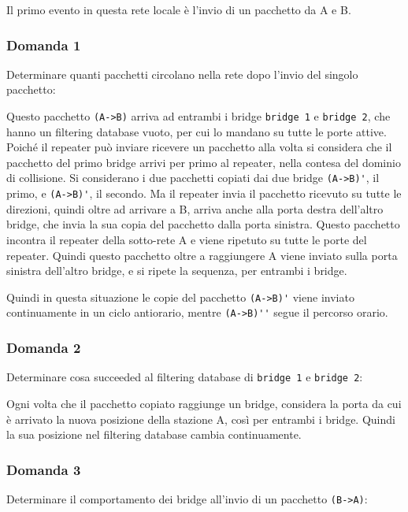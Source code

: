 \documentclass{article}
\numberwithin{equation}{subsection}
\begin{document}
Il primo evento in questa rete locale è l'invio di un pacchetto da A e B. 

\subsubsection*{Domanda 1}

Determinare quanti pacchetti circolano nella rete dopo l'invio del singolo pacchetto:

Questo pacchetto \verb|(A->B)| arriva ad entrambi i bridge \verb|bridge 1| e \verb|bridge 2|, che hanno un filtering database vuoto, per cui lo mandano su tutte le 
porte attive. Poiché il repeater può inviare ricevere un pacchetto alla volta si considera che il pacchetto del primo bridge arrivi per primo al repeater, nella 
contesa del dominio di collisione. Si considerano i due pacchetti copiati dai due bridge \verb|(A->B)'|, il primo, e \verb|(A->B)'|, il secondo. 
Ma il repeater invia il pacchetto ricevuto su tutte le direzioni, quindi oltre ad arrivare a B, arriva anche alla porta destra dell'altro bridge, che invia la sua copia 
del pacchetto dalla porta sinistra. Questo pacchetto incontra il repeater della sotto-rete A e viene ripetuto su tutte le porte del repeater. Quindi questo pacchetto 
oltre a raggiungere A viene inviato sulla porta sinistra dell'altro bridge, e si ripete la sequenza, per entrambi i bridge. 

Quindi in questa situazione le copie del pacchetto \verb|(A->B)'| viene inviato continuamente in un ciclo antiorario, mentre \verb|(A->B)''| segue il percorso 
orario. 

\subsubsection*{Domanda 2}

Determinare cosa succeeded al filtering database di \verb|bridge 1| e \verb|bridge 2|:

Ogni volta che il pacchetto copiato raggiunge un bridge, considera la porta da cui è arrivato la nuova posizione della stazione A, così per entrambi i bridge. 
Quindi la sua posizione nel filtering database cambia continuamente. 

\subsubsection*{Domanda 3}

Determinare il comportamento dei bridge all'invio di un pacchetto \verb|(B->A)|: 
\end{document}
